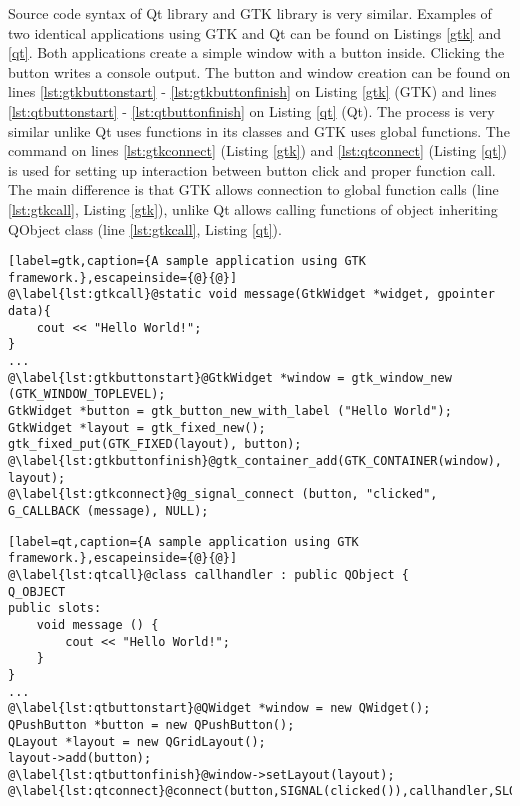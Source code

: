 Source code syntax of Qt library and GTK library is very similar. Examples of two identical applications using GTK and Qt can be found on Listings \ref{gtk} and \ref{qt}. Both applications create a simple window with a button inside. Clicking the button writes a console output. The button and window creation can be found on lines \ref{lst:gtkbuttonstart} - \ref{lst:gtkbuttonfinish} on Listing \ref{gtk} (GTK) and lines \ref{lst:qtbuttonstart} - \ref{lst:qtbuttonfinish} on Listing \ref{qt} (Qt). The process is very similar unlike Qt uses functions in its classes and GTK uses global functions. The command on lines \ref{lst:gtkconnect} (Listing \ref{gtk}) and \ref{lst:qtconnect} (Listing \ref{qt}) is used for setting up interaction between button click and proper function call. The main difference is that GTK allows connection to global function calls (line \ref{lst:gtkcall}, Listing \ref{gtk}), unlike Qt allows calling functions of object inheriting QObject class (line \ref{lst:gtkcall}, Listing \ref{qt}).

\begin{lstlisting}[label=gtk,caption={A sample application using GTK framework.},escapeinside={@}{@}]
@\label{lst:gtkcall}@static void message(GtkWidget *widget, gpointer data){
    cout << "Hello World!";
}
...
@\label{lst:gtkbuttonstart}@GtkWidget *window = gtk_window_new (GTK_WINDOW_TOPLEVEL);
GtkWidget *button = gtk_button_new_with_label ("Hello World");
GtkWidget *layout = gtk_fixed_new();
gtk_fixed_put(GTK_FIXED(layout), button);
@\label{lst:gtkbuttonfinish}@gtk_container_add(GTK_CONTAINER(window), layout);
@\label{lst:gtkconnect}@g_signal_connect (button, "clicked", G_CALLBACK (message), NULL);
\end{lstlisting}

\begin{lstlisting}[label=qt,caption={A sample application using GTK framework.},escapeinside={@}{@}]
@\label{lst:qtcall}@class callhandler : public QObject {
Q_OBJECT
public slots:
	void message () {
		cout << "Hello World!";
	}
}
...
@\label{lst:qtbuttonstart}@QWidget *window = new QWidget();
QPushButton *button = new QPushButton();
QLayout *layout = new QGridLayout();
layout->add(button);
@\label{lst:qtbuttonfinish}@window->setLayout(layout);
@\label{lst:qtconnect}@connect(button,SIGNAL(clicked()),callhandler,SLOT(message()));
\end{lstlisting}